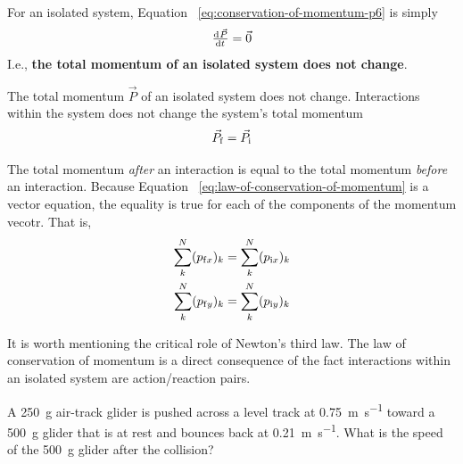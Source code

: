 For an isolated system, Equation~%
\ref{eq:conservation-of-momentum-p6} is simply
\begin{equation}
    \od{\vec{P}}{t} = \vec{0}
\end{equation}
I.e., \textbf{the total momentum of an isolated system does not change}.

\begin{theorem}
    The total momentum
    $
        \vec{P}
    $ of an isolated system does not change.  Interactions within the
    system does not change the system's total momentum
    \begin{equation}
        \label{eq:law-of-conservation-of-momentum} \vec{P}_{\mathrm{f}} = \vec{P}_{\mathrm{i}}
    \end{equation}
\end{theorem}
The total momentum \emph{after} an interaction is equal to the total
momentum \emph{before} an interaction.  Because Equation~%
\ref{eq:law-of-conservation-of-momentum} is a vector equation, the
equality is true for each of the components of the momentum vecotr. That
is,
\begin{align}
    \sum_k^N (p_{\mathrm{f} x})_k &= \sum_k^N (p_{\mathrm{i} x})_k \\
    \sum_k^N (p_{\mathrm{f} y})_k &= \sum_k^N (p_{\mathrm{i} y})_k
\end{align}
\begin{remark}
    It is worth mentioning the critical role of Newton's third law.  The
    law of conservation of momentum is a direct consequence of the fact
    interactions within an isolated system are action/reaction pairs.
\end{remark}

\begin{Exercise}[title={A glider collision}, origin={Knight}]
    A \SI{250}{\gram} air-track glider is pushed across a level track at
    \SI{0.75}{\metre\per\second} toward a \SI{500}{\gram} glider that is
    at rest and bounces back at \SI{0.21}{\metre\per\second}.  What is
    the speed of the \SI{500}{\gram} glider after the collision?
\end{Exercise}

